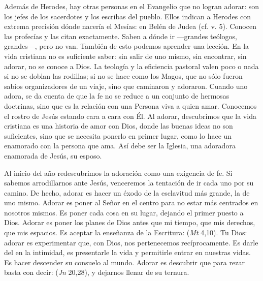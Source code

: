 \begin{body}
\begin{body}
{Además de Herodes, hay otras personas en el Evangelio que no logran adorar: son los jefes de los sacerdotes y los escribas del pueblo. Ellos indican a Herodes con extrema precisión dónde nacería el Mesías: en Belén de Judea (cf. v. 5). Conocen las profecías y las citan exactamente. Saben a dónde ir ---grandes teólogos, grandes---, pero no van. También de esto podemos aprender una lección. En la vida cristiana no es suficiente saber: sin salir de uno mismo, sin encontrar, sin adorar, no se conoce a Dios. La teología y la eficiencia pastoral valen poco o nada si no se doblan las rodillas; si no se hace como los Magos, que no sólo fueron sabios organizadores de un viaje, sino que caminaron y adoraron. Cuando uno adora, se da cuenta de que la fe no se reduce a un conjunto de hermosas doctrinas, sino que es la relación con una Persona viva a quien amar. Conocemos el rostro de Jesús estando cara a cara con Él. Al adorar, descubrimos que la vida cristiana es una historia de amor con Dios, donde las buenas ideas no son suficientes, sino que se necesita ponerlo en primer lugar, como lo hace un enamorado con la persona que ama. Así debe ser la Iglesia, una adoradora enamorada de Jesús, su esposo.

Al inicio del año redescubrimos la adoración como una exigencia de fe. Si sabemos arrodillarnos ante Jesús, venceremos la tentación de ir cada uno por su camino. De hecho, adorar es hacer un éxodo de la esclavitud más grande, la de uno mismo. Adorar es poner al Señor en el centro para no estar más centrados en nosotros mismos. Es poner cada cosa en su lugar, dejando el primer puesto a Dios. Adorar es poner los planes de Dios antes que mi tiempo, que mis derechos, que mis espacios. Es aceptar la enseñanza de la Escritura:  (\emph{Mt} 4,10). Tu Dios: adorar es experimentar que, con Dios, nos pertenecemos recíprocamente. Es darle del  en la intimidad, es presentarle la vida y permitirle entrar en nuestras vidas. Es hacer descender su consuelo al mundo. Adorar es descubrir que para rezar basta con decir:  (\emph{Jn} 20,28), y dejarnos llenar de su ternura.

}
\end{body}
\end{body}
